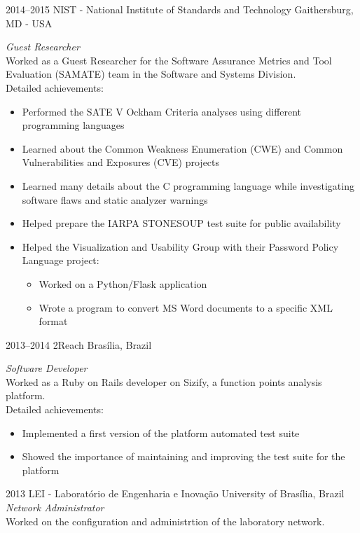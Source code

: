 \documentclass[]{friggeri-cv} %
\begin{document}
\begin{entrylist}
\entry
{2014--2015}
{NIST - National Institute of Standards and Technology}
{Gaithersburg, MD - USA}
{\emph{Guest Researcher} \\
  Worked as a Guest Researcher for the Software Assurance Metrics and Tool Evaluation (SAMATE) team in the Software and Systems Division. \\
Detailed achievements:
\begin{itemize}
\item Performed the SATE V Ockham Criteria analyses using different programming languages
\item Learned about the Common Weakness Enumeration (CWE) and Common Vulnerabilities and Exposures (CVE) projects
\item Learned many details about the C programming language while investigating software flaws and static analyzer warnings
\item Helped prepare the IARPA STONESOUP test suite for public availability
\item Helped the Visualization and Usability Group with their Password Policy Language project:
  \begin{itemize}
    \item Worked on a Python/Flask application
    \item Wrote a program to convert MS Word documents to a specific XML format
  \end{itemize}
\end{itemize}}


\entry
{2013--2014}
{2Reach}
{Brasília, Brazil}
{\emph{Software Developer} \\
  Worked as a Ruby on Rails developer on Sizify, a function points analysis platform. \\
Detailed achievements:
\begin{itemize}
  \item Implemented a first version of the platform automated test suite
  \item Showed the importance of maintaining and improving the test suite for the platform
\end{itemize}}

\entry
{2013}
{LEI - Laboratório de Engenharia e Inovação}
{University of Brasília, Brazil}
{\emph{Network Administrator} \\
  Worked on the configuration and administrtion of the laboratory network. \\
}


\end{entrylist}
\end{document}
